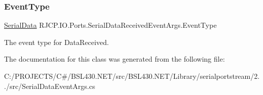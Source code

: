 \subsubsection{\texorpdfstring{EventType}{EventType}}
{\footnotesize\ttfamily \mbox{\hyperlink{namespace_r_j_c_p_1_1_i_o_1_1_ports_a2a76844574a0724e6b7755e2f6ec3681}{Serial\+Data}} R\+J\+C\+P.\+I\+O.\+Ports.\+Serial\+Data\+Received\+Event\+Args.\+Event\+Type\hspace{0.3cm}{\ttfamily [get]}}



The event type for Data\+Received. 



The documentation for this class was generated from the following file\+:\begin{DoxyCompactItemize}
\item 
C\+:/\+P\+R\+O\+J\+E\+C\+T\+S/\+C\#/\+B\+S\+L430.\+N\+E\+T/src/\+B\+S\+L430.\+N\+E\+T/\+Library/serialportstream/2../src/Serial\+Data\+Event\+Args.\+cs\end{DoxyCompactItemize}
